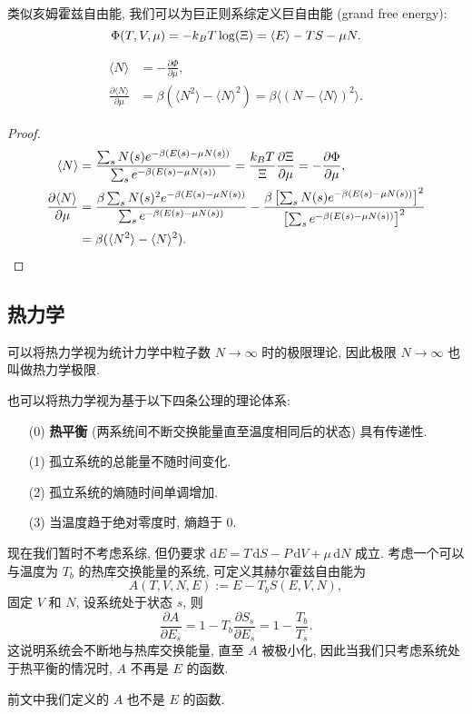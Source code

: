 类似亥姆霍兹自由能, 我们可以为巨正则系综定义巨自由能 (grand free energy):
\[ \Phi(T,V,\mu)=-k_B T\log(\Xi)=\langle E\rangle-TS-\mu N.\vspace{1.5ex}\]
\begin{proposition}\keepline
    \begin{align*}
        \langle N\rangle &=-\frac{\partial\Phi}{\partial\mu},\\ 
        \frac{\partial\langle N\rangle}{\partial\mu}&=\beta(\langle N^2\rangle-\langle N\rangle^2)=\beta\langle(N-\langle N\rangle)^2\rangle.
    \end{align*}
\end{proposition}
\vspace{0ex}
\begin{proof}\keepline
    \begin{align*}
        \langle N\rangle&=\frac{\sum_s N(s)e^{-\beta(E(s)-\mu N(s))}}{\sum_se^{-\beta(E(s)-\mu N(s))}}=\frac{k_BT}{\Xi}\frac{\partial\Xi}{\partial\mu}=-\frac{\partial\Phi}{\partial\mu},\\
        \frac{\partial\langle N\rangle}{\partial\mu}&=\frac{\beta\sum_s N(s)^2e^{-\beta(E(s)-\mu N(s))}}{\sum_se^{-\beta(E(s)-\mu N(s))}}-\frac{\beta\left[\sum_sN(s)e^{-\beta(E(s)-\mu N(s))}\right]^2}{\left[ \sum_se^{-\beta(E(s)-\mu N(s))} \right]^2}\\
        &=\beta(\langle N^2\rangle-\langle N\rangle^2).\qedhere
    \end{align*}
\end{proof}
\subsection{热力学}
可以将热力学视为统计力学中粒子数 $ N\to\infty $ 时的极限理论, 因此极限 $ N\to\infty $ 也叫做热力学极限.

也可以将热力学视为基于以下四条公理的理论体系:
\begin{enumerate}
    \item[(0)] {\bf 热平衡} (两系统间不断交换能量直至温度相同后的状态) 具有传递性.
    \item[(1)] 孤立系统的总能量不随时间变化.
    \item[(2)] 孤立系统的熵随时间单调增加.
    \item[(3)] 当温度趋于绝对零度时, 熵趋于 $ 0 $.
\end{enumerate}

现在我们暂时不考虑系综, 但仍要求 $ \mathrm{d}E=T\,\mathrm{d}S-P\,\mathrm{d}V+\mu\,\mathrm{d}N $ 成立. 考虑一个可以与温度为 $ T_b $ 的热库交换能量的系统, 可定义其赫尔霍兹自由能为
\[ A(T,V,N,E):=E-T_bS(E,V,N), \]
固定 $ V $ 和 $ N $, 设系统处于状态 $ s $, 则
\[ \frac{\partial A}{\partial E_s}=1-T_b\frac{\partial S_s}{\partial E_s}=1-\frac{T_b}{T_s}. \]
这说明系统会不断地与热库交换能量, 直至 $ A $ 被极小化, 因此当我们只考虑系统处于热平衡的情况时, $ A $ 不再是 $ E $ 的函数. 
\begin{remark}
    前文中我们定义的 $ A $ 也不是 $ E $ 的函数.
\end{remark}

